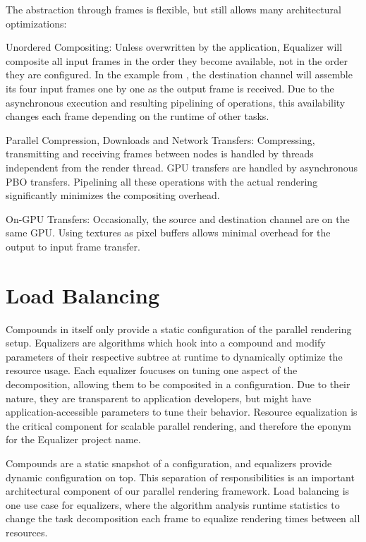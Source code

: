 The abstraction through frames is flexible, but still allows many architectural
optimizations:
\begin{compactdesc}
\item[Unordered Compositing:] Unless overwritten by the application, Equalizer
will composite all input frames in the order they become available, not in the
order they are configured. In the example from , the
destination channel will assemble its four input frames one by one as the output
frame is received. Due to the asynchronous execution and resulting pipelining of
operations, this availability changes each frame depending on the runtime of
other tasks.

\item[Parallel Compression, Downloads and Network Transfers:] Compressing,
transmitting and receiving frames between nodes is handled by threads
independent from the render thread. GPU transfers are handled by asynchronous
PBO transfers. Pipelining all these operations with the actual rendering
significantly minimizes the compositing overhead.

\item[On-GPU Transfers:] Occasionally, the source and destination channel are on
the same GPU. Using textures as pixel buffers allows minimal overhead for the
output to input frame transfer.
\end{compactdesc}

\section{Load Balancing}

Compounds in itself only provide a static configuration of the parallel
rendering setup. \textsf{Equalizers} are algorithms which hook into a compound
and modify parameters of their respective subtree at runtime to dynamically
optimize the resource usage. Each equalizer foucuses on tuning one aspect of
the decomposition, allowing them to be composited in a configuration. Due to
their nature, they are transparent to application developers, but might have
application-accessible parameters to tune their behavior. Resource equalization
is the critical component for scalable parallel rendering, and therefore the
eponym for the \textsf{Equalizer} project name.

Compounds are a static snapshot of a configuration, and equalizers provide
dynamic configuration on top. This separation of responsibilities is an
important architectural component of our parallel rendering framework. Load
balancing is one use case for equalizers, where the algorithm analysis runtime
statistics to change the task decomposition each frame to equalize rendering
times between all resources.

